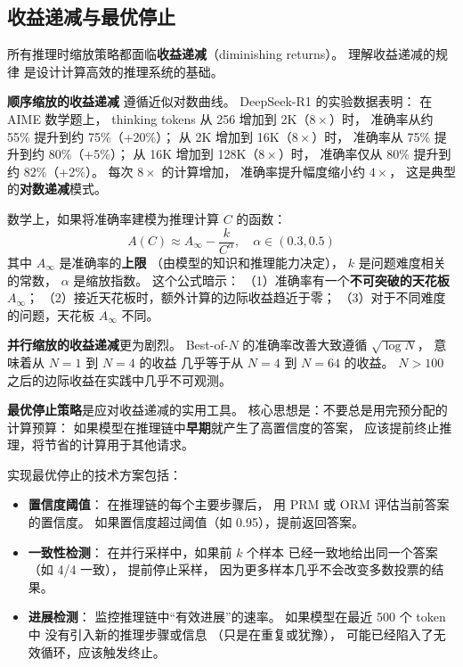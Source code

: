 \subsection{收益递减与最优停止}

所有推理时缩放策略都面临\textbf{收益递减}（diminishing returns）。
理解收益递减的规律
是设计计算高效的推理系统的基础。

\textbf{顺序缩放的收益递减}
遵循近似对数曲线。
DeepSeek-R1 的实验数据表明：
在 AIME 数学题上，
thinking tokens 从 256 增加到 2K（$8\times$）时，
准确率从约 55\% 提升到约 75\%（+20\%）；
从 2K 增加到 16K（$8\times$）时，
准确率从 75\% 提升到约 80\%（+5\%）；
从 16K 增加到 128K（$8\times$）时，
准确率仅从 80\% 提升到约 82\%（+2\%）。
每次 $8\times$ 的计算增加，
准确率提升幅度缩小约 $4\times$，
这是典型的\textbf{对数递减}模式。

数学上，如果将准确率建模为推理计算 $C$ 的函数：
\begin{equation}
  A(C) \approx A_\infty - \frac{k}{C^\alpha}, \quad \alpha \in (0.3, 0.5)
\end{equation}
其中 $A_\infty$ 是准确率的\textbf{上限}
（由模型的知识和推理能力决定），
$k$ 是问题难度相关的常数，
$\alpha$ 是缩放指数。
这个公式暗示：
（1）准确率有一个\textbf{不可突破的天花板} $A_\infty$；
（2）接近天花板时，额外计算的边际收益趋近于零；
（3）对于不同难度的问题，天花板 $A_\infty$ 不同。

\textbf{并行缩放的收益递减}更为剧烈。
Best-of-$N$ 的准确率改善大致遵循 $\sqrt{\log N}$，
意味着从 $N = 1$ 到 $N = 4$ 的收益
几乎等于从 $N = 4$ 到 $N = 64$ 的收益。
$N > 100$ 之后的边际收益在实践中几乎不可观测。

\textbf{最优停止策略}是应对收益递减的实用工具。
核心思想是：不要总是用完预分配的计算预算：
如果模型在推理链中\textbf{早期}就产生了高置信度的答案，
应该提前终止推理，将节省的计算用于其他请求。

实现最优停止的技术方案包括：
\begin{itemize}[noitemsep]
  \item \textbf{置信度阈值}：
        在推理链的每个主要步骤后，
        用 PRM 或 ORM 评估当前答案的置信度。
        如果置信度超过阈值（如 0.95），提前返回答案。
  \item \textbf{一致性检测}：
        在并行采样中，如果前 $k$ 个样本
        已经一致地给出同一个答案（如 4/4 一致），
        提前停止采样，
        因为更多样本几乎不会改变多数投票的结果。
  \item \textbf{进展检测}：
        监控推理链中“有效进展”的速率。
        如果模型在最近 500 个 token 中
        没有引入新的推理步骤或信息
        （只是在重复或犹豫），
        可能已经陷入了无效循环，应该触发终止。
\end{itemize}

